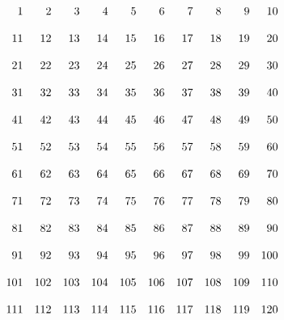 \documentclass[nooutcomes]{ximera}
\begin{document}
\begin{problem}
\[\begin{array}{r r r r r r r r r r}
  1 &   2 &   3 &   4 &   5 &   6 &   7 &   8 &   9 &  10\\
  \\
 11 &  12 &  13 &  14 &  15 &  16 &  17 &  18 &  19 &  20\\
 \\
 21 &  22 &  23 &  24 &  25 &  26 &  27 &  28 &  29 &  30\\
 \\
 31 &  32 &  33 &  34 &  35 &  36 &  37 &  38 &  39 &  40\\
 \\
 41 &  42 &  43 &  44 &  45 &  46 &  47 &  48 &  49 &  50\\
 \\
 51 &  52 &  53 &  54 &  55 &  56 &  57 &  58 &  59 &  60\\
 \\
 61 &  62 &  63 &  64 &  65 &  66 &  67 &  68 &  69 &  70\\
 \\
 71 &  72 &  73 &  74 &  75 &  76 &  77 &  78 &  79 &  80\\
 \\
 81 &  82 &  83 &  84 &  85 &  86 &  87 &  88 &  89 &  90\\
 \\
 91 &  92 &  93 &  94 &  95 &  96 &  97 &  98 &  99 & 100\\
 \\
101 & 102 & 103 & 104 & 105 & 106 & 107 & 108 & 109 & 110\\
\\
111 & 112 & 113 & 114 & 115 & 116 & 117 & 118 & 119 & 120\\
\end{array}
\]
\end{problem}


\end{document}
